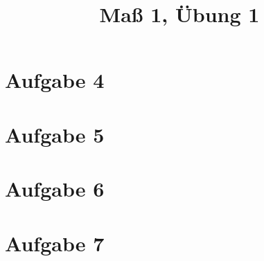 \documentclass[]{article}
\author{}
\title{Maß 1, Übung 1}
\begin{document}
    \begin{titlepage}
        \maketitle
    \end{titlepage}
    
    \section{Aufgabe 4}
    
    \section{Aufgabe 5}
    
    \section{Aufgabe 6}
    
    \section{Aufgabe 7}
    
\end{document}
